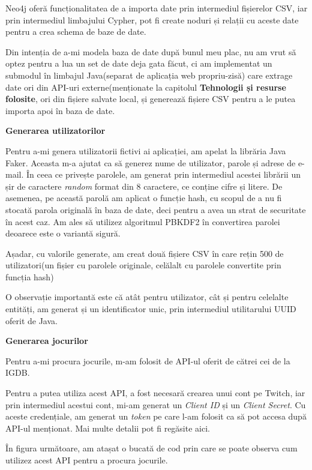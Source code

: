 \documentclass[12pt,a4paper]{report}
\begin{document}
Neo4j oferă funcționalitatea de a importa date prin intermediul fișierelor CSV, iar prin intermediul limbajului Cypher, pot fi create noduri și relații cu aceste date pentru a crea schema de baze de date.

Din intenția de a-mi modela baza de date după bunul meu plac, nu am vrut să optez pentru a lua un set de date deja gata făcut, ci am implementat un submodul în limbajul Java(separat de aplicația web propriu-zisă) care extrage date ori din API-uri externe(menționate la capitolul \textbf{Tehnologii și resurse folosite}, ori din fișiere salvate local, și generează fișiere CSV pentru a le putea importa apoi în baza de date.

\bigskip
\textbf{Generarea utilizatorilor}
\bigskip

Pentru a-mi genera utilizatorii fictivi ai aplicației, am apelat la librăria Java Faker. Aceasta m-a ajutat ca să generez nume de utilizator, parole și adrese de e-mail. În ceea ce privește parolele, am generat prin intermediul acestei librării un șir de caractere \emph{random} format din 8 caractere, ce conține cifre și litere. De asemenea, pe această parolă am aplicat o funcție hash, cu scopul de a nu fi stocată parola originală în baza de date, deci pentru a avea un strat de securitate în acest caz. Am ales să utilizez algoritmul PBKDF2 în convertirea parolei deoarece este o variantă sigură. \cite{15}

Așadar, cu valorile generate, am creat două fișiere CSV în care rețin 500 de utilizatori(un fișier cu parolele originale, celălalt cu parolele convertite prin funcția hash)

O observație importantă este că atât pentru utilizator, cât și pentru celelalte entități, am generat și un identificator unic, prin intermediul utilitarului UUID oferit de Java.

\bigskip
\textbf{Generarea jocurilor}
\bigskip

Pentru a-mi procura jocurile, m-am folosit de API-ul oferit de cătrei cei de la IGDB.

Pentru a putea utiliza acest API, a fost necesară crearea unui cont pe Twitch, iar prin intermediul acestui cont, mi-am generat un \emph{Client ID} și un \emph{Client Secret}. Cu aceste credențiale, am generat un \emph{token} pe care l-am folosit ca să pot accesa după API-ul menționat. Mai multe detalii pot fi regăsite aici. \cite{16}

În figura următoare, am atașat o bucată de cod prin care se poate observa cum utilizez acest API pentru a procura jocurile.
\end{document}
